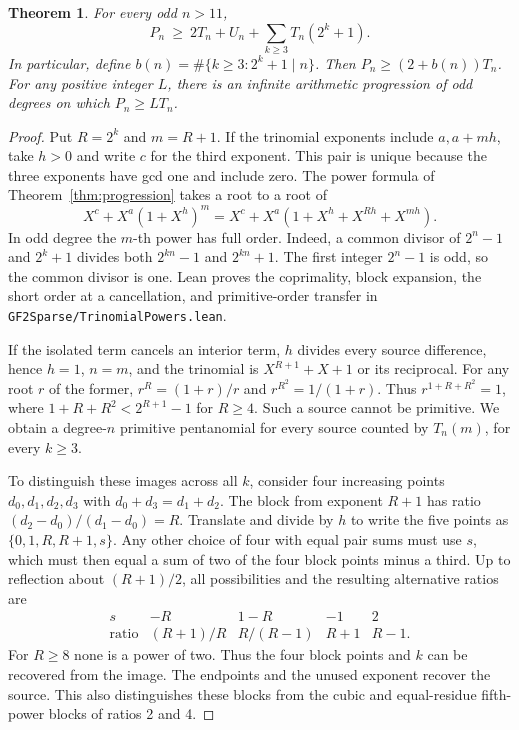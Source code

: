 \documentclass[11pt]{article}
\newtheorem{theorem}{Theorem}
\begin{document}
\begin{theorem}
For every odd \(n>11\),
\[
       P_n\ \ge\ 2T_n+U_n+\sum_{k\ge3}T_n(2^k+1).
\]
In particular, define \(b(n)=\#\{k\ge3:2^k+1\mid n\}\).
Then \(P_n\ge(2+b(n))T_n\). For any positive integer \(L\), there
is an infinite arithmetic progression of odd degrees on which
\(P_n\ge L T_n\).
\end{theorem}
\begin{proof}
Put \(R=2^k\) and \(m=R+1\). If the trinomial exponents include
\(a,a+mh\), take \(h>0\) and write \(c\) for the third exponent.
This pair is unique because the three exponents have gcd one and
include zero. The power formula of Theorem~\ref{thm:progression}
takes a root to a root of
\[
         X^c+X^a(1+X^h)^m
           =X^c+X^a(1+X^h+X^{Rh}+X^{mh}).
\]
In odd degree the \(m\)-th power has full order. Indeed, a common
divisor of \(2^n-1\) and \(2^k+1\) divides both \(2^{kn}-1\) and
\(2^{kn}+1\). The first integer \(2^n-1\) is odd, so the common
divisor is one. Lean proves the coprimality, block expansion, the
short order at a cancellation, and primitive-order transfer in \nolinkurl{GF2Sparse/TrinomialPowers.lean}.

If the isolated term cancels an interior term, \(h\) divides every
source difference, hence \(h=1\), \(n=m\), and the trinomial is
\(X^{R+1}+X+1\) or its reciprocal. For any root \(r\) of the former,
\(r^R=(1+r)/r\) and \(r^{R^2}=1/(1+r)\). Thus
\(r^{1+R+R^2}=1\), where \(1+R+R^2<2^{R+1}-1\) for \(R\ge4\).
Such a source cannot be primitive. We obtain a degree-\(n\)
primitive pentanomial for every source counted by \(T_n(m)\), for
every \(k\ge3\).

To distinguish these images across all \(k\), consider four increasing
points \(d_0,d_1,d_2,d_3\) with \(d_0+d_3=d_1+d_2\).
The block from exponent \(R+1\) has ratio \((d_2-d_0)/(d_1-d_0)=R\).
Translate and divide by \(h\) to write the five points as
\(\{0,1,R,R+1,s\}\). Any other choice of four with equal pair sums
must use \(s\), which must then equal a sum of two of the four block
points minus a third. Up to reflection about \((R+1)/2\), all
possibilities and the resulting alternative ratios are
\[
\begin{array}{c|cccc}
s&-R&1-R&-1&2\\\hline
\text{ratio}&(R+1)/R&R/(R-1)&R+1&R-1 .
\end{array}
\]
For \(R\ge8\) none is a power of two. Thus the four block points and
\(k\) can be recovered from the image. The endpoints and the unused
exponent recover the source. This also distinguishes these blocks
from the cubic and equal-residue fifth-power blocks of ratios 2 and 4.


\end{proof}
\end{document}
